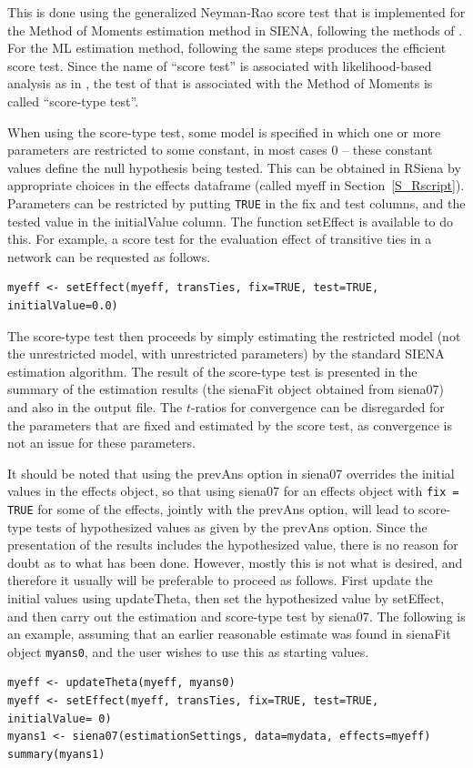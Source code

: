 \documentclass[a4paper,fleqn,11pt]{article}
\newcommand{\+}{\, + \,}
\newcommand{\sfn}[1]{\textsf{#1}}
\newcommand{\RS}{{\sf RSiena }}
\newcommand{\SI}{{\sf SIENA }}
\newcommand{\si}{{\sf SIENA}}
\begin{document}
This is done using the generalized Neyman-Rao score test
that is implemented for the Method of Moments estimation method
in \si, following the methods of \citet{Schweinberger12}.
For the ML estimation method,
following the same steps produces the \citet{Rao47} efficient score test.
Since the name of ``score test'' is associated with
likelihood-based analysis as in \citet{Rao47}, the test
of  \citet{Schweinberger12} that is associated with the Method of Moments
is called ``score-type test''.

When using the score-type test, some model
is specified in which one or more parameters are restricted to some
constant, in most cases $0$ -- these constant values
define the null hypothesis being tested.
This can be obtained in \RS by appropriate choices in the effects dataframe
(called \sfn{myeff} in Section~\ref{S_Rscript}).
Parameters can be restricted by
putting \texttt{TRUE} in the \sfn{fix} and \sfn{test} columns, and
the tested value in the \sfn{initialValue} column.
The function \sfn{setEffect} is available to do this.
For example, a score test for the evaluation effect of transitive ties
in a network can be requested as follows.
\begin{verbatim}
myeff <- setEffect(myeff, transTies, fix=TRUE, test=TRUE, initialValue=0.0)
\end{verbatim}

The score-type test then
proceeds by simply estimating the restricted model (not the unrestricted model,
with unrestricted parameters) by the standard \SI estimation algorithm.
The result of the score-type test is presented in the \sfn{summary}
of the estimation results (the \sfn{sienaFit} object obtained from
\sfn{siena07}) and also in the output file.
The $t$-ratios for convergence can be disregarded for the parameters
that are fixed and estimated by the score test, as convergence is not an issue
for these parameters.

It should be noted that using the \sfn{prevAns} option in \sfn{siena07}
overrides the initial values in the effects object,
so that using \sfn{siena07} for an effects object with
\texttt{fix = TRUE} for some of the effects, jointly with
the \sfn{prevAns} option, will lead to score-type tests
of hypothesized values as given by the  \sfn{prevAns} option.
Since the presentation of the results includes the
hypothesized value, there is no reason for doubt as to what
has been done. However, mostly this is not what is desired,
and therefore it usually will be preferable to proceed as follows.
First update the initial values using \sfn{updateTheta}, then
set the hypothesized value by \sfn{setEffect}, and then
carry out the estimation and score-type test by \sfn{siena07}.
The following is an example, assuming that an earlier
reasonable estimate was found in \sfn{sienaFit} object \texttt{myans0},
and the user wishes to use this as starting values.
\begin{verbatim}
myeff <- updateTheta(myeff, myans0)
myeff <- setEffect(myeff, transTies, fix=TRUE, test=TRUE, initialValue= 0)
myans1 <- siena07(estimationSettings, data=mydata, effects=myeff)
summary(myans1)
\end{verbatim}
\end{document}
